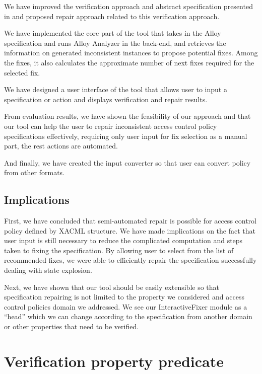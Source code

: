 \documentclass[letterpaper]{acm_proc_article-sp}
\begin{document}
We have improved the verification approach and abstract specification presented in \cite{acp:alloy} and proposed repair approach related to this verification approach.

We have implemented the core part of the tool that takes in the Alloy specification and runs Alloy Analyzer in the back-end, and retrieves the information on generated inconsistent instances to propose potential fixes. Among the fixes, it also calculates the approximate number of next fixes required for the selected fix. 

We have designed a user interface of the tool that allows user to input a specification or action and displays verification and repair results. 

From evaluation results, we have shown the feasibility of our approach and that our tool can help the user to repair inconsistent access control policy specifications effectively, requiring only user input for fix selection as a manual part, the rest actions are automated. 

And finally, we have created the input converter so that user can convert policy from other formats. 

\subsection{Implications}

First, we have concluded that semi-automated repair is possible for access control policy defined by XACML structure. 
We have made implications on the fact that user input is still necessary to reduce the complicated computation and steps taken to fixing the specification. By allowing user to select from the list of recommended fixes, we were able to efficiently repair the specification successfully dealing with state explosion.

Next, we have shown that our tool should be easily extensible so that specification repairing is not limited to the property we considered and access control policies domain we addressed. We see our InteractiveFixer module as a ``head'' which we can change according to the specification from another domain or other properties that need to be verified. 


{}


\appendix
\section{Verification property predicate} \label{appendix:A}
\end{document}
